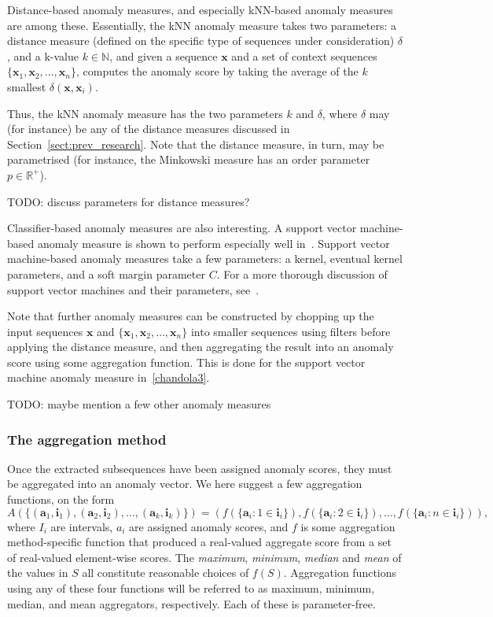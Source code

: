 Distance-based anomaly measures, and especially kNN-based anomaly measures are among these. Essentially, the kNN anomaly measure takes two parameters: a distance measure (defined on the specific type of sequences under consideration) $\delta$, and a k-value $k \in \mathbb{N}$, and given a sequence $\mathbf{x}$ and a set of context sequences $\{\mathbf{x}_1, \mathbf{x}_2, \dots, \mathbf{x}_n\}$, computes the anomaly score by taking the average of the $k$ smallest $\delta(\mathbf{x}, \mathbf{x}_i)$.

Thus, the kNN anomaly measure has the two parameters $k$ and $\delta$, where $\delta$ may (for instance) be any of the distance measures discussed in Section~\ref{sect:prev_research}. Note that the distance measure, in turn, may be parametrised (for instance, the Minkowski measure has an order parameter $p \in \mathbb{R}^+$).

TODO: discuss parameters for distance measures?

Classifier-based anomaly measures are also interesting. A support vector machine-based anomaly measure is shown to perform especially well in~\cite{chandola3}. Support vector machine-based anomaly measures take a few parameters: a kernel, eventual kernel parameters, and a soft margin parameter $C$. For a more thorough discussion of support vector machines and their parameters, see~\cite{TODO}.

Note that further anomaly measures can be constructed by chopping up the input sequences $\mathbf{x}$ and $\{\mathbf{x}_1, \mathbf{x}_2, \dots, \mathbf{x}_n\}$ into smaller sequences using filters before applying the distance measure, and then aggregating the result into an anomaly score using some aggregation function. This is done for the support vector machine anomaly measure in~\ref{chandola3}.

TODO: maybe mention a few other anomaly measures

\subsubsection{The aggregation method}
\label{sect:aggregation_method}

Once the extracted subsequences have been assigned anomaly scores, they must be aggregated into an anomaly vector. We here suggest a few aggregation functions, on the form
\[
    A(\{(\mathbf{a}_1, \mathbf{i}_1), (\mathbf{a}_2, \mathbf{i}_2), \dots, (\mathbf{a}_k, \mathbf{i}_k) \}) = (f(\{\mathbf{a}_i: 1 \in \mathbf{i}_i\}), f(\{\mathbf{a}_i: 2 \in \mathbf{i}_i\}), \dots, f(\{\mathbf{a}_i: n \in \mathbf{i}_i\})),
\]
where $I_i$ are intervals, $a_i$ are assigned anomaly scores, and $f$ is some aggregation method-specific function that produced a real-valued aggregate score from a set of real-valued element-wise scores. The \emph{maximum}, \emph{minimum}, \emph{median} and \emph{mean} of the values in $S$ all constitute reasonable choices of $f(S)$. Aggregation functions using any of these four functions will be referred to as maximum, minimum, median, and mean aggregators, respectively. Each of these is parameter-free.

